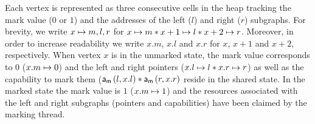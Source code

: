 Each vertex is represented as three consecutive cells in the heap tracking the mark value ($0$ or $1$) and the addresses of the left ($l$) and right ($r$) subgraphs. For brevity, we write $x \mapsto m, l, r$ for $x \mapsto m * x+1 \mapsto l * x+2 \mapsto r$. Moreover, in order to increase readability we write $x.m$, $x.l$ and $x.r$ for $x$, $x+1$ and $x+2$, respectively. When vertex $x$ is in the unmarked state, the mark value corresponds to $0$ ($x.m \mapsto 0$) and the left and right pointers ($x.l \mapsto l * x.r \mapsto r$) as well as the capability to mark them ($\mathsf{a}_{\textsf{m}}\left(l, x.l\right) * \mathsf{a}_{\textsf{m}}\left(r, x.r\right)$ reside in the shared state. In the marked state the mark value is $1$ ($x.m \mapsto 1$) and the resources associated with the left and right subgraphs (pointers and capabilities) have been claimed by the marking thread. 

